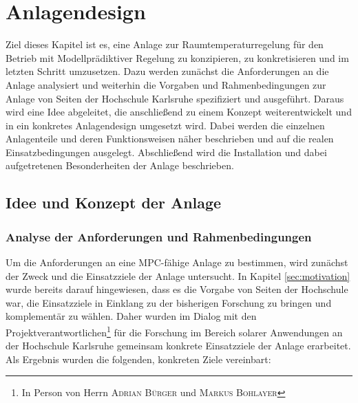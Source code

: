 %
%

\renewcommand{\chapterheadstartvskip}{\vspace*{2cm}}

\chapter{Anlagendesign}
\label{chap:anlagendesign}

\renewcommand{\chapterheadstartvskip}{\vspace*{-0.5cm}}

Ziel dieses Kapitel ist es, eine Anlage zur Raumtemperaturregelung für den Betrieb mit Modellprädiktiver Regelung zu konzipieren, zu konkretisieren und im letzten Schritt umzusetzen. Dazu werden zunächst die Anforderungen an die Anlage analysiert und weiterhin die Vorgaben und Rahmenbedingungen zur Anlage von Seiten der Hochschule Karlsruhe spezifiziert und ausgeführt. Daraus wird eine Idee abgeleitet, die anschließend zu einem Konzept weiterentwickelt und in ein konkretes Anlagendesign umgesetzt wird. Dabei werden die einzelnen Anlagenteile und deren Funktionsweisen näher beschrieben und auf die realen Einsatzbedingungen ausgelegt. Abschließend wird die Installation und dabei aufgetretenen Besonderheiten der Anlage beschrieben.

\section{Idee und Konzept der Anlage}


\subsection{Analyse der Anforderungen und Rahmenbedingungen}
\label{sec:anforderungen}

Um die Anforderungen an eine MPC-fähige Anlage zu bestimmen, wird zunächst der Zweck und die Einsatzziele der Anlage untersucht. In Kapitel \ref{sec:motivation} wurde bereits darauf hingewiesen, dass es die Vorgabe von Seiten der Hochschule war, die Einsatzziele in Einklang zu der bisherigen Forschung zu bringen und komplementär zu wählen. Daher wurden im Dialog mit den Projektverantwortlichen\footnote{In Person von Herrn \textsc{Adrian Bürger} und \textsc{Markus Bohlayer}} für die Forschung im Bereich solarer Anwendungen an der Hochschule Karlsruhe gemeinsam konkrete Einsatzziele der Anlage erarbeitet. Als Ergebnis wurden die folgenden, konkreten Ziele vereinbart:
 
